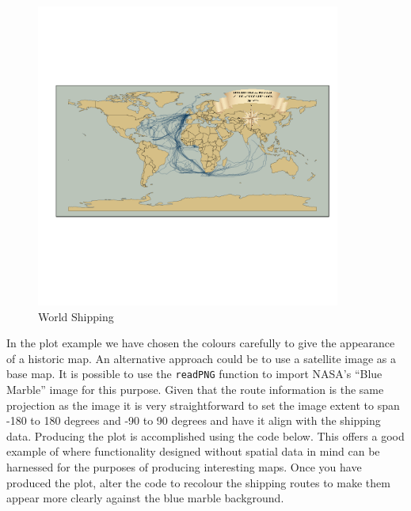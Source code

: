 \documentclass[]{article}
\let\Oldincludegraphics\includegraphics
\renewcommand{\includegraphics}[1]{\Oldincludegraphics[width=10cm]{#1}}
\begin{document}
\begin{figure}[htbp]
\centering
\includegraphics{figure/World_Shipping.png}
\caption{World Shipping}
\end{figure}

In the plot example we have chosen the colours carefully to give the
appearance of a historic map. An alternative approach could be to use a
satellite image as a base map. It is possible to use the
\texttt{readPNG} function to import NASA's ``Blue Marble'' image for
this purpose. Given that the route information is the same projection as
the image it is very straightforward to set the image extent to span
-180 to 180 degrees and -90 to 90 degrees and have it align with the
shipping data. Producing the plot is accomplished using the code below.
This offers a good example of where functionality designed without
spatial data in mind can be harnessed for the purposes of producing
interesting maps. Once you have produced the plot, alter the code to
recolour the shipping routes to make them appear more clearly against
the blue marble background.
\end{document}
